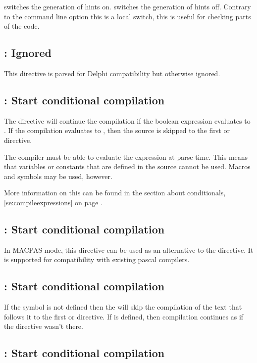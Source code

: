  switches the generation of hints on.
 switches the generation of hints off.
Contrary to the command line option  this is a local switch,
this is useful for checking parts of the code.

\subsection{: Ignored}
This directive is parsed for Delphi compatibility but otherwise ignored.

\subsection{ : Start conditional compilation}

The directive  will continue the compilation
if the boolean expression  evaluates to . If the
compilation evaluates to , then the source is skipped to the first
 or  directive.

The compiler must be able to evaluate the expression at parse time.
This means that variables or constants that are defined in
the source cannot be used. Macros and symbols may be used, however.

More information on this can be found in the section about
conditionals, \ref{se:compileexpressions} on page \pageref{se:compileexpressions}.

\subsection{ : Start conditional compilation}
In MACPAS mode, this directive can be used as an alternative to the 
directive. It is supported for compatibility with existing \macos pascal
compilers.

\subsection{ : Start conditional compilation}

If the symbol  is not defined then the 
will skip the compilation of the text that follows it to the first
 or  directive.
If  is defined, then compilation continues as if the directive
wasn't there.

\subsection{ : Start conditional compilation}

